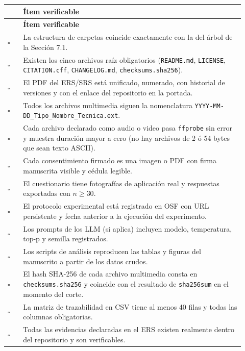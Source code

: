 \documentclass[11pt,a4paper]{article}
\newcommand{\hh}[1]{\cellcolor{uteqgreen}\textbf{\color{white}\small #1}}
\begin{document}
\begin{longtable}{@{}p{0.06\linewidth} p{0.86\linewidth}@{}}
    \hh{\phantom{X}} & \hh{Ítem verificable}\\
    \endfirsthead
    \hh{\phantom{X}} & \hh{Ítem verificable}\\
    \endhead
    $\square$ & La estructura de carpetas coincide exactamente con la del árbol de la Sección 7.1.\\
    $\square$ & Existen los cinco archivos raíz obligatorios (\texttt{README.md}, \texttt{LICENSE}, \texttt{CITATION.cff}, \texttt{CHANGELOG.md}, \texttt{checksums.sha256}).\\
    $\square$ & El PDF del ERS/SRS está unificado, numerado, con historial de versiones y con el enlace del repositorio en la portada.\\
    $\square$ & Todos los archivos multimedia siguen la nomenclatura \texttt{YYYY-MM-DD\_Tipo\_Nombre\_Tecnica.ext}.\\
    $\square$ & Cada archivo declarado como audio o video pasa \texttt{ffprobe} sin error y muestra duración mayor a cero (no hay archivos de 2 ó 54 bytes que sean texto ASCII).\\
    $\square$ & Cada consentimiento firmado es una imagen o PDF con firma manuscrita visible y cédula legible.\\
    $\square$ & El cuestionario tiene fotografías de aplicación real y respuestas exportadas con $n \geq 30$.\\
    $\square$ & El protocolo experimental está registrado en OSF con URL persistente y fecha anterior a la ejecución del experimento.\\
    $\square$ & Los prompts de los LLM (si aplica) incluyen modelo, temperatura, top-p y semilla registrados.\\
    $\square$ & Los scripts de análisis reproducen las tablas y figuras del manuscrito a partir de los datos crudos.\\
    $\square$ & El hash SHA-256 de cada archivo multimedia consta en \texttt{checksums.sha256} y coincide con el resultado de \texttt{sha256sum} en el momento del corte.\\
    $\square$ & La matriz de trazabilidad en CSV tiene al menos 40 filas y todas las columnas obligatorias.\\
    $\square$ & Todas las evidencias declaradas en el ERS existen realmente dentro del repositorio y son verificables.\\
\end{longtable}
\end{document}
